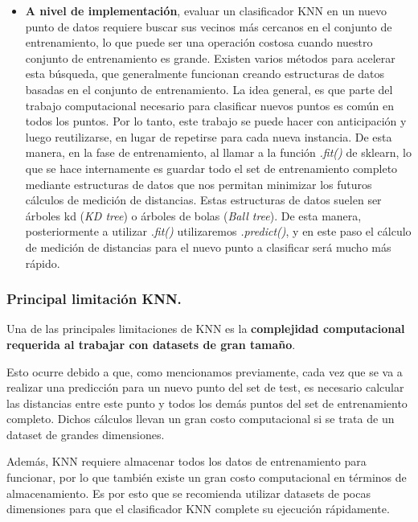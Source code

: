 \documentclass[12pt,a4paper]{article}
\begin{document}
\begin{sloppypar}
\begin{itemize}
\item \textbf{A nivel de implementación}, evaluar un clasificador KNN en un nuevo punto de datos requiere buscar sus vecinos más cercanos en el conjunto de entrenamiento, lo que puede ser una operación costosa cuando nuestro conjunto de entrenamiento es grande. Existen varios métodos para acelerar esta búsqueda, que generalmente funcionan creando estructuras de datos basadas en el conjunto de entrenamiento. La idea general, es que parte del trabajo computacional necesario para clasificar nuevos puntos es común en todos los puntos. Por lo tanto, este trabajo se puede hacer con anticipación y luego reutilizarse, en lugar de repetirse para cada nueva instancia. De esta manera, en la fase de entrenamiento, al llamar a la función \textit{.fit()} de sklearn, lo que se hace internamente es guardar todo el set de entrenamiento completo mediante estructuras de datos que nos permitan minimizar los futuros cálculos de medición de distancias. Estas estructuras de datos suelen ser árboles kd (\textit{KD tree}) o árboles de bolas (\textit{Ball tree}). De esta manera, posteriormente a utilizar \textit{.fit()} utilizaremos \textit{.predict()}, y en este paso el cálculo de medición de distancias para el nuevo punto a clasificar será mucho más rápido.\\
\end{itemize} 

\subsubsection{Principal limitación KNN.}

Una de las principales limitaciones de KNN\cite{KNN_limitacion} es la \textbf{complejidad computacional requerida al trabajar con datasets de gran tamaño}. 

Esto ocurre debido a que, como mencionamos previamente, cada vez que se va a realizar una predicción para un nuevo punto del set de test, es necesario calcular las distancias entre este punto y todos los demás puntos del set de entrenamiento completo. Dichos cálculos llevan un gran costo computacional si se trata de un dataset de grandes dimensiones. 

Además, KNN requiere almacenar todos los datos de entrenamiento para funcionar, por lo que también existe un gran costo computacional en términos de almacenamiento. Es por esto que se recomienda utilizar datasets de pocas dimensiones para que el clasificador KNN complete su ejecución rápidamente. \\


\end{sloppypar}
\end{document}
